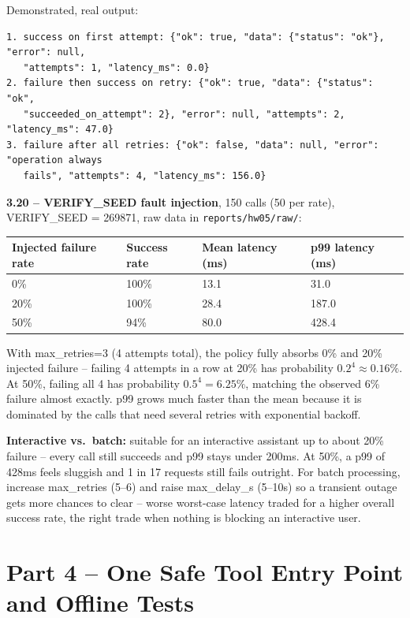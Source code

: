 \documentclass[11pt]{article}
\begin{document}
Demonstrated, real output:

\begin{lstlisting}
1. success on first attempt: {"ok": true, "data": {"status": "ok"}, "error": null,
   "attempts": 1, "latency_ms": 0.0}
2. failure then success on retry: {"ok": true, "data": {"status": "ok",
   "succeeded_on_attempt": 2}, "error": null, "attempts": 2, "latency_ms": 47.0}
3. failure after all retries: {"ok": false, "data": null, "error": "operation always
   fails", "attempts": 4, "latency_ms": 156.0}
\end{lstlisting}

\textbf{3.20 -- VERIFY\_SEED fault injection}, 150 calls (50 per rate),
VERIFY\_SEED = 269871, raw data in \verb|reports/hw05/raw/|:

\begin{tabular}{|l|l|l|l|}\hline
\textbf{Injected failure rate} & \textbf{Success rate} & \textbf{Mean latency (ms)} & \textbf{p99 latency (ms)} \\\hline
0\%  & 100\% & 13.1 & 31.0 \\\hline
20\% & 100\% & 28.4 & 187.0 \\\hline
50\% & 94\%  & 80.0 & 428.4 \\\hline
\end{tabular}
\vspace{0.5em}

With max\_retries=3 (4 attempts total), the policy fully absorbs 0\% and
20\% injected failure -- failing 4 attempts in a row at 20\% has
probability $0.2^4 \approx 0.16\%$. At 50\%, failing all 4 has probability
$0.5^4 = 6.25\%$, matching the observed 6\% failure almost exactly. p99
grows much faster than the mean because it is dominated by the calls that
need several retries with exponential backoff.

\textbf{Interactive vs.\ batch:} suitable for an interactive assistant up
to about 20\% failure -- every call still succeeds and p99 stays under
200ms. At 50\%, a p99 of 428ms feels sluggish and 1 in 17 requests still
fails outright. For batch processing, increase max\_retries (5--6) and
raise max\_delay\_s (5--10s) so a transient outage gets more chances to
clear -- worse worst-case latency traded for a higher overall success rate,
the right trade when nothing is blocking an interactive user.

\section*{Part 4 -- One Safe Tool Entry Point and Offline Tests}
\end{document}
